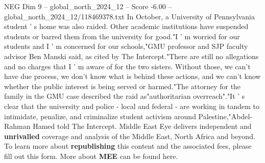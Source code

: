\begin{textsample}{NEG Dim 9 – global\_north\_2024\_12 – Score -6.00 – global\_north\_2024\_12/118469378.txt}
In October, a University of Pennsylvania student ' s home was also raided.
Other academic institutions have suspended students or barred them from the university for good."I ' m worried for our students and I ' m concerned for our schools,"GMU professor and SJP faculty advisor Ben Manski said, as cited by The Intercept."There are still no allegations and no charges that I ' m aware of for the two sisters.
Without those, we can't have due process, we don't know what is behind these actions, and we can't know whether the public interest is being served or harmed."The attorney for the family in the GMU case described the raid as"authoritarian overreach"."It ' s clear that the university and police - local and federal - are working in tandem to intimidate, penalize, and criminalize student activism around Palestine,"Abdel-Rahman Hamed told The Intercept.
Middle East Eye delivers independent and \textbf{unrivalled} coverage and analysis of the Middle East, North Africa and beyond.
To learn more about \textbf{republishing} this content and the associated fees, please fill out this form.
More about \textbf{MEE} can be found here.

\end{textsample}
